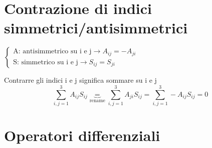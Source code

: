 \documentclass[a4paper,11pt]{report}
\theoremstyle{remark}
\theoremstyle{definition}
\begin{document}
\section*{Contrazione di indici simmetrici/antisimmetrici}
$\begin{cases}
    \text{A: antisimmetrico su i e j} \rightarrow A_{ij}=-A_{ji} \\
    \text{S: simmetrico su i e j} \rightarrow S_{ij} = S_{ji}
\end{cases}$ \newline

\noindent Contrarre gli indici i e j significa sommare su i e j
\begin{equation*}
    \sum_{i,j=1}^3 A_{ij}S_{ij}\underbrace{=}_{\text{rename}}\sum_{i,j=1}^3 A_{ji}S_{ij} = \sum_{i,j=1}^3 -A_{ij}S_{ij} =0
\end{equation*}

\section{Operatori differenziali}
\end{document}
